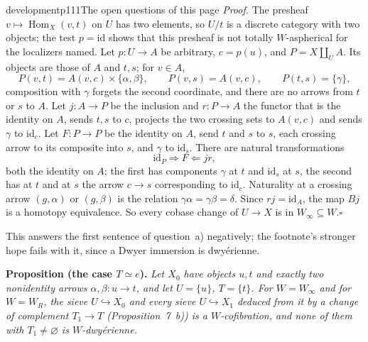 \begin{enumerate}[label=\alph*)]
\begin{dcomment}{development}{p111}{The open questions of this page}
\textit{Proof.}
The presheaf $v\mapsto\operatorname{Hom}_X(v,t)$ on $U$ has two elements, so $U/t$ is a discrete category with two objects; the test $p=\mathrm{id}$ shows that this presheaf is not totally $W$-aspherical for the localizers named. Let $p:U\to A$ be arbitrary, $c=p(u)$, and $P=X\amalg_UA$. Its objects are those of $A$ and $t,s$; for $v\in A$,
\[
 P(v,t)=A(v,c)\times\{\alpha,\beta\},\qquad P(v,s)=A(v,c),\qquad P(t,s)=\{\gamma\},
\]
composition with $\gamma$ forgets the second coordinate, and there are no arrows from $t$ or $s$ to $A$. Let $j:A\to P$ be the inclusion and $r:P\to A$ the functor that is the identity on $A$, sends $t,s$ to $c$, projects the two crossing sets to $A(v,c)$ and sends $\gamma$ to $\mathrm{id}_c$. Let $F:P\to P$ be the identity on $A$, send $t$ and $s$ to $s$, each crossing arrow to its composite into $s$, and $\gamma$ to $\mathrm{id}_s$. There are natural transformations
\[
 \mathrm{id}_P\Longrightarrow F\Longleftarrow jr,
\]
both the identity on $A$; the first has components $\gamma$ at $t$ and $\mathrm{id}_s$ at $s$, the second has at $t$ and at $s$ the arrow $c\to s$ corresponding to $\mathrm{id}_c$. Naturality at a crossing arrow $(g,\alpha)$ or $(g,\beta)$ is the relation $\gamma\alpha=\gamma\beta=\delta$. Since $rj=\mathrm{id}_A$, the map $Bj$ is a homotopy equivalence. So every cobase change of $U\to X$ is in $W_\infty\subseteq W$.\hfill$\square$

This answers the first sentence of question~a) negatively; the footnote's stronger hope fails with it, since a Dwyer immersion is dwy\'erienne.

\textbf{Proposition (the case $T\simeq e$).}\ours
\textit{Let $X_0$ have objects $u,t$ and exactly two nonidentity arrows $\alpha,\beta:u\to t$, and let $U=\{u\}$, $T=\{t\}$. For $W=W_\infty$ and for $W=W_R$, the sieve $U\hookrightarrow X_0$ and every sieve $U\hookrightarrow X_1$ deduced from it by a change of complement $T_1\to T$ (Proposition~7~b)) is a $W$-cofibration, and none of them with $T_1\neq\varnothing$ is $W$-dwy\'erienne.}


\end{dcomment}
\end{enumerate}
